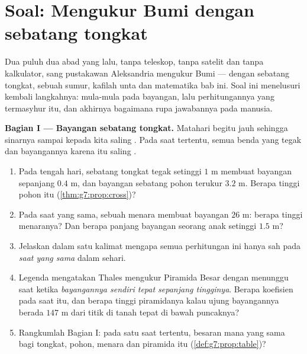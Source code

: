 \section{Soal: Mengukur Bumi dengan sebatang tongkat}

\begin{problem}
\label{pb:g7:prop:1}
Dua puluh dua abad yang lalu, tanpa teleskop, tanpa satelit dan
tanpa kalkulator, sang pustakawan Aleksandria mengukur Bumi ---
dengan sebatang tongkat, sebuah sumur, kafilah unta dan matematika
bab ini. Soal ini menelusuri kembali langkahnya: mula-mula
 pada bayangan, lalu perhitungannya yang
termasyhur itu, dan akhirnya bagaimana rupa jawabannya pada 
manusia.

\medskip
\noindent\textbf{Bagian I --- Bayangan sebatang tongkat.}
Matahari begitu jauh sehingga sinarnya sampai kepada kita saling
. Pada saat tertentu, semua benda yang tegak dan bayangannya
karena itu saling .
\begin{enumerate}
  \item Pada tengah hari, sebatang tongkat tegak setinggi $1$ m
        membuat bayangan sepanjang $0.4$ m, dan bayangan sebatang
        pohon terukur $3.2$ m. Berapa tinggi pohon itu
        (\cref{thm:g7:prop:cross})?
  \item Pada saat yang sama, sebuah menara membuat bayangan $26$ m:
        berapa tinggi menaranya? Dan berapa panjang bayangan seorang
        anak setinggi $1.5$ m?
  \item Jelaskan dalam satu kalimat mengapa semua perhitungan ini
        hanya sah pada \emph{saat yang sama} dalam sehari.
  \item Legenda mengatakan Thales mengukur Piramida Besar dengan
        menunggu saat ketika \emph{bayangannya sendiri tepat sepanjang
        tingginya}. Berapa koefisien  pada saat
        itu, dan berapa tinggi piramidanya kalau ujung bayangannya
        berada $147$ m dari titik di tanah tepat di bawah puncaknya?
  \item Rangkumlah Bagian I: pada satu saat tertentu, besaran mana
        yang sama bagi tongkat, pohon, menara dan piramida itu
        (\cref{def:g7:prop:table})?
\end{enumerate}


\end{problem}

